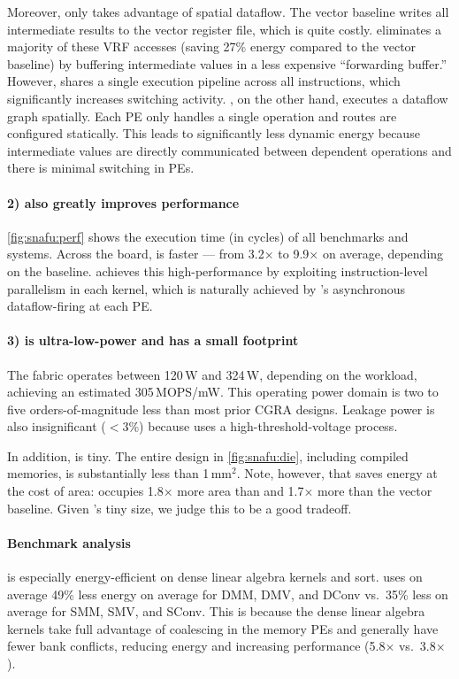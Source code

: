 Moreover, only \snafuarch takes advantage of spatial dataflow.
%
The vector baseline writes all intermediate results to the vector register file, which is quite costly.
% 
\manic eliminates a majority of these VRF accesses (saving 27\% energy compared to the vector baseline) by 
buffering intermediate values in a less expensive ``forwarding buffer.''
% 
However, \manic shares a single execution pipeline across all instructions,
% 
which significantly increases switching activity. 
% 
\snafuarch, on the other hand, executes a dataflow graph spatially.
% 
Each PE only handles a single operation and routes are configured statically.
% 
This leads to significantly less dynamic energy because intermediate values are directly communicated between dependent operations and there is minimal switching in PEs.

\paragraph{2) \snafuarch also greatly improves performance}
\autoref{fig:snafu:perf} shows the execution time (in cycles) of all benchmarks and systems.
% 
Across the board, \snafuarch is faster --- from 3.2$\times$ to 9.9$\times$ on average, depending on the baseline. 
% 
\snafuarch achieves this high-performance by exploiting instruction-level parallelism in each kernel,
%
which is naturally achieved by \snafuframe's asynchronous dataflow-firing at each PE.

\paragraph{3) \snafuarch is ultra-low-power and has a small footprint}
% 
The \snafuarch fabric operates between 120\,\textmu W and 324\,\textmu W, depending on the workload, achieving an estimated 305\,MOPS/mW.
% 
This operating power domain is two to five orders-of-magnitude less than most prior CGRA designs.
% 
Leakage power is also insignificant ($<$3\%) because \snafuarch uses a high-threshold-voltage process.
% 

In addition, \snafuarch is tiny.
The entire design in \autoref{fig:snafu:die}, including compiled memories, is substantially less than 1\,mm$^2$.
Note, however, that \snafuarch saves energy at the cost of area:
\snafuarch occupies 1.8$\times$ more area than \manic and 1.7$\times$ more than the vector baseline.
%
Given \snafuarch's tiny size, we judge this to be a good tradeoff.

\paragraph{Benchmark analysis}
\snafuarch is especially energy-efficient on dense linear algebra kernels and sort.
% 
\snafuarch uses on average 49\% less energy on average for DMM, DMV, and DConv vs.\ 35\% less on average for SMM, SMV, and SConv. 
% 
This is because the dense linear algebra kernels take full advantage of coalescing in the memory PEs and generally have fewer bank conflicts, reducing energy and increasing performance (5.8$\times$ vs.\ 3.8$\times$). 
 
